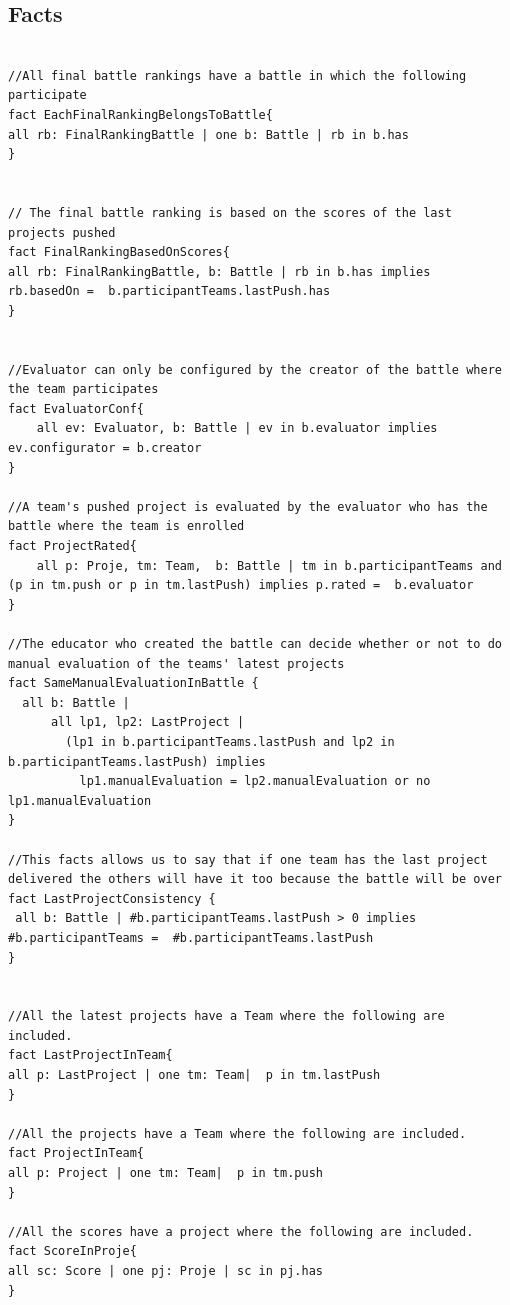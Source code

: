\subsection{Facts}

\begin{lstlisting}

//All final battle rankings have a battle in which the following participate
fact EachFinalRankingBelongsToBattle{
all rb: FinalRankingBattle | one b: Battle | rb in b.has 
}


// The final battle ranking is based on the scores of the last projects pushed 
fact FinalRankingBasedOnScores{
all rb: FinalRankingBattle, b: Battle | rb in b.has implies  rb.basedOn =  b.participantTeams.lastPush.has 
}


//Evaluator can only be configured by the creator of the battle where the team participates 
fact EvaluatorConf{
	all ev: Evaluator, b: Battle | ev in b.evaluator implies ev.configurator = b.creator
}

//A team's pushed project is evaluated by the evaluator who has the battle where the team is enrolled
fact ProjectRated{
	all p: Proje, tm: Team,  b: Battle | tm in b.participantTeams and (p in tm.push or p in tm.lastPush) implies p.rated =  b.evaluator
}

//The educator who created the battle can decide whether or not to do manual evaluation of the teams' latest projects 
fact SameManualEvaluationInBattle {
  all b: Battle |
      all lp1, lp2: LastProject |
        (lp1 in b.participantTeams.lastPush and lp2 in b.participantTeams.lastPush) implies
          lp1.manualEvaluation = lp2.manualEvaluation or no lp1.manualEvaluation 
}

//This facts allows us to say that if one team has the last project delivered the others will have it too because the battle will be over
fact LastProjectConsistency {
 all b: Battle | #b.participantTeams.lastPush > 0 implies #b.participantTeams =  #b.participantTeams.lastPush
}


//All the latest projects have a Team where the following are included.
fact LastProjectInTeam{
all p: LastProject | one tm: Team|  p in tm.lastPush
}

//All the projects have a Team where the following are included.
fact ProjectInTeam{
all p: Project | one tm: Team|  p in tm.push
}

//All the scores have a project where the following are included.
fact ScoreInProje{
all sc: Score | one pj: Proje | sc in pj.has
}


\end{lstlisting}
